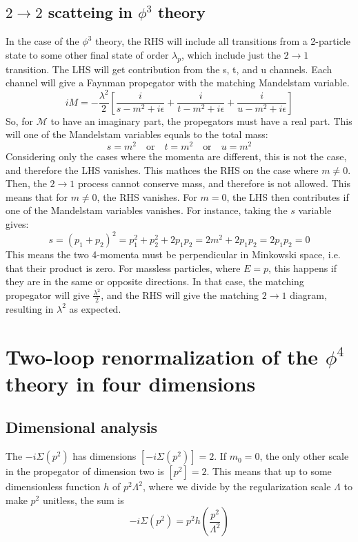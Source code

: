 \documentclass{article}
\begin{document}
\subsection{$2\rightarrow2$ scatteing in $\phi^3$ theory}
In the case of the $\phi^3$ theory, the RHS will include all transitions from a 2-particle state to some other final state of order $\lambda_p$, which include just the $2 \rightarrow 1$ transition.
\newline
The LHS will get contribution from the s, t, and u channels. Each channel will give a Faynman propegator with the matching Mandelstam variable.
\begin{equation}
    iM = - \frac{\lambda^2}{2}\left[\frac{i}{s - m^2 + i\epsilon} + \frac{i}{t - m^2 + i\epsilon} + \frac{i}{u - m^2 + i\epsilon}\right]
\end{equation}
So, for $\mathcal{M}$ to have an imaginary part, the propegators must have a real part. This will one of the Mandelstam variables equals to the total mass:
\begin{equation}
    s = m^2 \quad \text{or} \quad t = m^2 \quad \text{or} \quad u = m^2
\end{equation}
Considering only the cases where the momenta are different, this is not the case, and therefore the LHS vanishes.
\newline
This mathces the RHS on the case where $m \ne 0$. Then, the $2 \rightarrow 1$ process cannot conserve mass, and therefore is not allowed. This means that for $m \ne 0$, the RHS vanishes.
\newline
For $m = 0$, the LHS then contributes if one of the Mandelstam variables vanishes. For instance, taking the $s$ variable gives:
\begin{equation}
    s = (p_1 + p_2)^2 = p_1^2 + p_2^2 + 2p_1p_2 = 2m^2 + 2p_1p_2 = 2p_1p_2 = 0
\end{equation}
This means the two 4-momenta must be perpendicular in Minkowski space, i.e. that their product is zero. For massless particles, where $E = p$, this happens if they are in the same or opposite directions. In that case, the matching propegator will give $\frac{\lambda^2}{2}$, and the RHS will give the matching $2 \rightarrow 1$ diagram, resulting in $\lambda^2$ as expected.

\newpage
\section{Two-loop renormalization of the $\phi^4$ theory in four dimensions}
\subsection{Dimensional analysis}
The $-i\Sigma(p^2)$ has dimensions $\left[-i\Sigma(p^2)\right] = 2$. If $m_0 = 0$, the only other scale in the propegator of dimension two is $\left[p^2\right] = 2$. This means that up to some dimensionless function $h$ of $p^2\Lambda^2$, where we divide by the regularization scale $\Lambda$ to make $p^2$ unitless, the sum is
\begin{equation}
    -i\Sigma\left(p^2\right) = p^2 h\left(\frac{p^2}{\Lambda^2}\right)
\end{equation}
\end{document}

